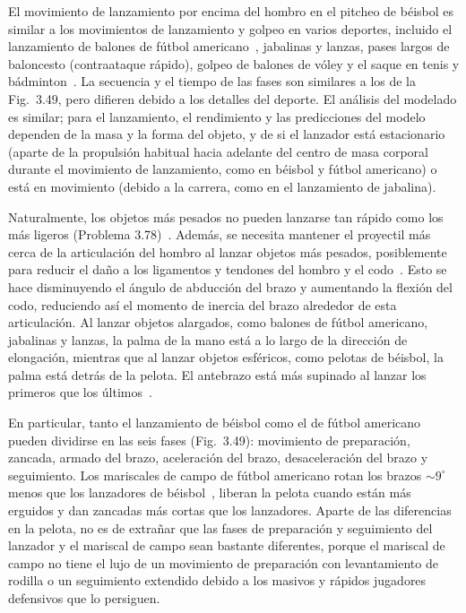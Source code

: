 \documentclass[12pt]{book}
\begin{document}
El movimiento de lanzamiento por encima del hombro en el pitcheo de béisbol es similar a los movimientos de lanzamiento y golpeo en varios deportes, incluido el lanzamiento de balones de fútbol americano~\cite{ref47}, jabalinas y lanzas, pases largos de baloncesto (contraataque rápido), golpeo de balones de vóley y el saque en tenis y bádminton~\cite{ref8,ref121}. La secuencia y el tiempo de las fases son similares a los de la Fig.~3.49, pero difieren debido a los detalles del deporte. El análisis del modelado es similar; para el lanzamiento, el rendimiento y las predicciones del modelo dependen de la masa y la forma del objeto, y de si el lanzador está estacionario (aparte de la propulsión habitual hacia adelante del centro de masa corporal durante el movimiento de lanzamiento, como en béisbol y fútbol americano) o está en movimiento (debido a la carrera, como en el lanzamiento de jabalina).

Naturalmente, los objetos más pesados no pueden lanzarse tan rápido como los más ligeros (Problema 3.78)~\cite{ref47}. Además, se necesita mantener el proyectil más cerca de la articulación del hombro al lanzar objetos más pesados, posiblemente para reducir el daño a los ligamentos y tendones del hombro y el codo~\cite{ref121}. Esto se hace disminuyendo el ángulo de abducción del brazo y aumentando la flexión del codo, reduciendo así el momento de inercia del brazo alrededor de esta articulación. Al lanzar objetos alargados, como balones de fútbol americano, jabalinas y lanzas, la palma de la mano está a lo largo de la dirección de elongación, mientras que al lanzar objetos esféricos, como pelotas de béisbol, la palma está detrás de la pelota. El antebrazo está más supinado al lanzar los primeros que los últimos~\cite{ref121}.

En particular, tanto el lanzamiento de béisbol como el de fútbol americano pueden dividirse en las seis fases (Fig.~3.49): movimiento de preparación, zancada, armado del brazo, aceleración del brazo, desaceleración del brazo y seguimiento. Los mariscales de campo de fútbol americano rotan los brazos $\sim 9^\circ$ menos que los lanzadores de béisbol~\cite{ref47}, liberan la pelota cuando están más erguidos y dan zancadas más cortas que los lanzadores. Aparte de las diferencias en la pelota, no es de extrañar que las fases de preparación y seguimiento del lanzador y el mariscal de campo sean bastante diferentes, porque el mariscal de campo no tiene el lujo de un movimiento de preparación con levantamiento de rodilla o un seguimiento extendido debido a los masivos y rápidos jugadores defensivos que lo persiguen.
\end{document}
